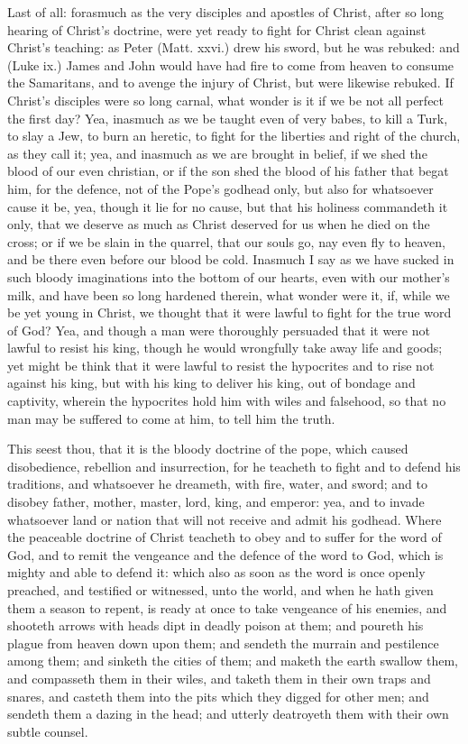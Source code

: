 Last of all: forasmuch as the very disciples and apostles 
of Christ, after so long hearing of Christ's doctrine, were 
yet ready to fight for Christ clean against Christ's teaching:
as Peter (Matt. xxvi.) drew his sword, but he was rebuked:
and (Luke ix.) James and John would have had fire to 
come from heaven to consume the Samaritans, and to 
avenge the injury of Christ, but were likewise rebuked. If 
Christ's disciples were so long carnal, what wonder is it if 
we be not all perfect the first day? Yea, inasmuch as we 
be taught even of very babes, to kill a Turk, to slay a Jew, 
to burn an heretic, to fight for the liberties and right of 
the church, as they call it; yea, and inasmuch as we are 
brought in belief, if we shed the blood of our even christian,
or if the son shed the blood of his father that begat him, 
for the defence, not of the Pope's godhead only, but also 
for whatsoever cause it be, yea, though it lie for no cause, 
but that his holiness commandeth it only, that we deserve 
as much as Christ deserved for us when he died on the 
cross; or if we be slain in the quarrel, that our souls go, 
nay even fly to heaven, and be there even before our blood 
be cold. Inasmuch I say as we have sucked in such bloody 
imaginations into the bottom of our hearts, even with our 
mother's milk, and have been so long hardened therein, 
what wonder were it, if, while we be yet young in Christ, 
we thought that it were lawful to fight for the true word of 
God? Yea, and though a man were thoroughly persuaded 
that it were not lawful to resist his king, though he would 
wrongfully take away life and goods; yet might be think 
that it were lawful to resist the hypocrites and to rise not 
against his king, but with his king to deliver his king, out 
of bondage and captivity, wherein the hypocrites hold him 
with wiles and falsehood, so that no man may be suffered 
to come at him, to tell him the truth. 

This seest thou, that it is the bloody doctrine of the pope, 
which caused disobedience, rebellion and insurrection, for 
he teacheth to fight and to defend his traditions, and whatsoever
he dreameth, with fire, water, and sword; and to disobey
father, mother, master, lord, king, and emperor: yea, 
and to invade whatsoever land or nation that will not receive 
and admit his godhead. Where the peaceable doctrine of 
Christ teacheth to obey and to suffer for the word of God, 
and to remit the vengeance and the defence of the word to 
God, which is mighty and able to defend it: which also as 
soon as the word is once openly preached, and testified or 
witnessed, unto the world, and when he hath given them a 
season to repent, is ready at once to take vengeance of his 
enemies, and shooteth arrows with heads dipt in deadly 
poison at them; and poureth his plague from heaven down 
upon them; and sendeth the murrain and pestilence among 
them; and sinketh the cities of them; and maketh the earth 
swallow them, and compasseth them in their wiles, and 
taketh them in their own traps and snares, and casteth 
them into the pits which they digged for other men; and
sendeth them a dazing in the head; and utterly deatroyeth
them with their own subtle counsel.

